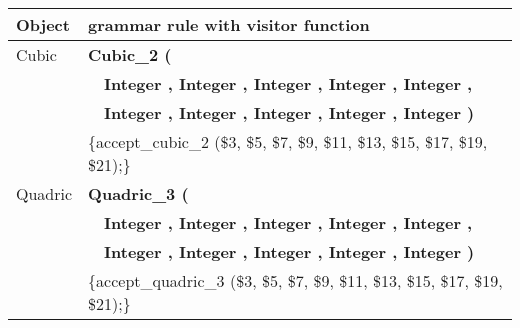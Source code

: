 \begin{tabular}{*{2}{| l} |}
\end {tabular}

\newpage

\begin{tabular}{*{2}{| l} |} \hline
Object   & grammar rule with visitor function          \\ \hline \hline
Cubic   & {\bf Cubic\_2 (}        \\
        & \ \ {\bf Integer , Integer , Integer , Integer , Integer ,} \\
        & \ \ {\bf Integer , Integer , Integer , Integer , Integer )}  \\
        & \{accept\_cubic\_2 (\$3, \$5, \$7, \$9, \$11, \$13, \$15, \$17, \$19, \$21);\}\\ \hline
Quadric & {\bf Quadric\_3 (}      \\
        & \ \ {\bf Integer , Integer , Integer , Integer , Integer ,}  \\
        & \ \ {\bf Integer , Integer , Integer , Integer , Integer )}                  \\ 
        & \{accept\_quadric\_3 (\$3, \$5, \$7, \$9, \$11, \$13, \$15, \$17, \$19, \$21);\}\\ \hline

\end{tabular}
